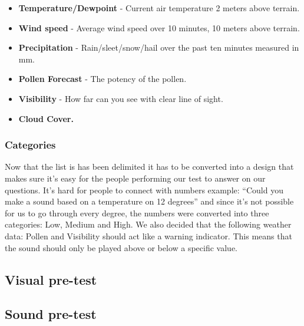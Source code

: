 \begin{itemize}
     \item \textbf{Temperature/Dewpoint} - Current air temperature 2 meters above terrain.
     \item \textbf{Wind speed} - Average wind speed over 10 minutes, 10 meters above terrain.
     \item \textbf{Precipitation} - Rain/sleet/snow/hail over the past ten minutes measured in mm.
     \item \textbf{Pollen Forecast} - The potency of the pollen.
     \item \textbf{Visibility} - How far can you see with clear line of sight.
     \item \textbf{Cloud Cover.}
 \end{itemize}



\subsubsection{Categories} %
\label{ssub:categories}

Now that the list is has been delimited it has to be converted into a design that makes sure it’s easy for the people performing our test to answer on our questions. 
It’s hard for people to connect with numbers example: “Could you make a sound based on a temperature on 12 degrees” and since it’s not possible for us to go through every degree, the numbers were converted into three categories: Low, Medium and High. 
We also decided that the following weather data: Pollen and Visibility should act like a warning indicator. 
This means that the sound should only be played above or below a specific value.



\subsection{Visual pre-test} %
\label{sub:visual_pre_test}





\subsection{Sound pre-test} %
\label{sub:sound_pre_test}

